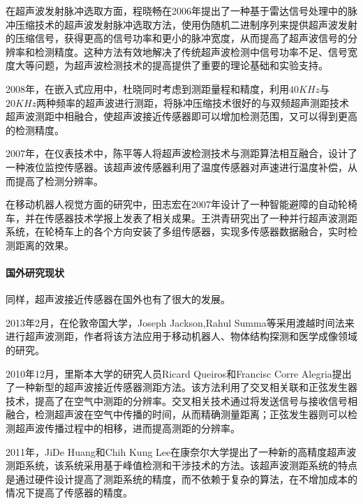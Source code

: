 	在超声波发射脉冲选取方面，程晓畅在2006年提出了一种基于雷达信号处理中的脉冲压缩技术的超声波发射脉冲选取方法，使用伪随机二进制序列来提供超声波发射的压缩信号，获得更高的信号功率和更小的脉冲宽度，从而提高了超声波信号的分辨率和检测精度。这种方法有效地解决了传统超声波检测中信号功率不足、信号宽度大等问题，为超声波检测技术的提高提供了重要的理论基础和实验支持。
	
	2008年，在嵌入式应用中，杜晓同时考虑到测距量程和精度，利用$40KHz$与$20KHz$两种频率的超声波进行测距，将脉冲压缩技术很好的与双频超声测距技术超声波测距中相融合，使超声波接近传感器即可以增加检测范围，又可以得到更高的检测精度。
		
	2007年，在仪表技术中，陈平等人将超声波检测技术与测距算法相互融合，设计了一种液位监控传感器。该超声波传感器利用了温度传感器对声速进行温度补偿，从而提高了检测分辨率。
	
	在移动机器人视觉方面的研究中，田志宏在2007年设计了一种智能避障的自动轮椅车，并在传感器技术学报上发表了相关成果。王洪青研究出了一种并行超声波测距系统，在轮椅车上的各个方向安装了多组传感器，实现多传感器数据融合，实时检测距离的效果。
	
    \paragraph{国外研究现状}
	同样，超声波接近传感器在国外也有了很大的发展。
	
	2013年2月，在伦敦帝国大学，Joseph Jackson,Rahul Summa等采用渡越时间法来进行超声波测距，作者将该方法应用于移动机器人、物体结构探测和医学成像领域的研究。
	
	2010年12月，里斯本大学的研究人员Ricard Queiros和Francisc Corre Alegria提出了一种新型的超声波接近传感器测距方法。该方法利用了交叉相关联和正弦发生器技术，提高了在空气中测距的分辨率。交叉相关技术通过将发送信号与接收信号相融合，检测超声波在空气中传播的时间，从而精确测量距离；正弦发生器则可以检测超声波传播过程中的相移，进而提高测距的分辨率。
	
	2011年，JiDe Huang和Chih Kung Lee在康奈尔大学提出了一种新的高精度超声波测距系统，该系统采用基于峰值检测和干涉技术的方法。该超声波测距系统的特点是通过硬件设计提高了测距系统的精度，而不依赖于复杂的算法，在不增加成本的情况下提高了传感器的精度。
	
    
